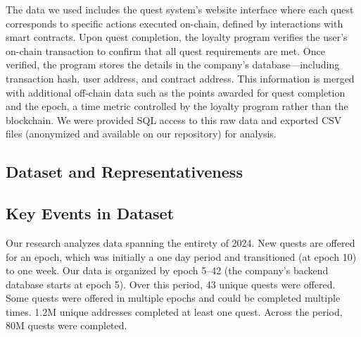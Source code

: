 The data we used includes the quest system's website interface where each quest corresponds to specific actions executed on-chain, defined by interactions with smart contracts. Upon quest completion, the loyalty program verifies the user's on-chain transaction to confirm that all quest requirements are met. Once verified, the program stores the details in the company's database—including transaction hash, user address, and contract address. This information is merged with additional off-chain data such as the points awarded for quest completion and the epoch, a time metric controlled by the loyalty program rather than the blockchain. We were provided SQL access to this raw data and exported CSV files (anonymized and available on our repository) for analysis.


\subsection{Dataset and Representativeness}




\subsection{Key Events in Dataset}

Our research analyzes data spanning the entirety of 2024. New quests are offered for an epoch, which was initially a one day period and transitioned (at epoch 10) to one week. Our data is organized by epoch 5--42 (the company's backend database starts at epoch 5). Over this period, 43 unique quests were offered. Some quests were offered in multiple epochs and could be completed multiple times. 1.2M unique addresses completed at least one quest.  Across the period, 80M quests were completed.

